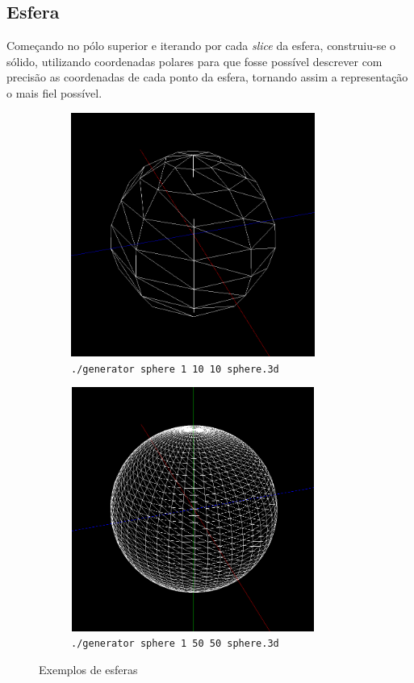 \documentclass[11pt,a4paper]{report}
\begin{document}
\subsection{Esfera}
\vspace{0.5cm}
Começando no pólo superior e iterando por cada \textit{slice} da esfera, construiu-se o sólido, utilizando coordenadas polares para que fosse possível descrever com precisão as coordenadas de cada ponto da esfera, tornando assim a representação o mais fiel possível.
\vspace{1cm}
\begin{figure}[H]
\centering
\begin{subfigure}{0.5\textwidth}
  \centering
  \includegraphics[width = 8cm,height = 8cm]{esfera1.png}
  \caption{\texttt{./generator sphere 1 10 10 sphere.3d}}
  \label{fig:esfera1}
\end{subfigure}%
\begin{subfigure}{0.5\textwidth}
  \centering
  \includegraphics[width = 8cm,height = 8cm]{esfera2.png}
  \caption{\texttt{./generator sphere 1 50 50 sphere.3d}}
  \label{fig:esfera2}
\end{subfigure}
\caption{Exemplos de esferas}
\label{fig:esfera}
\end{figure}
\newpage
\end{document}

